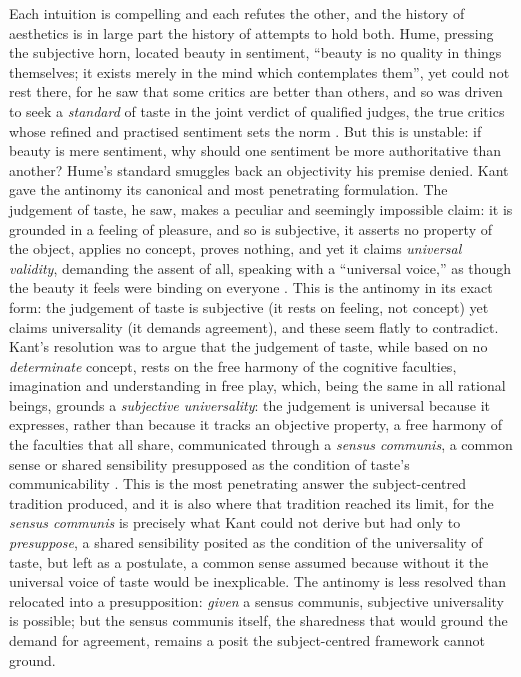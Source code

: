 Each intuition is compelling and each refutes the other, and the history of aesthetics is in large part the history of attempts to hold both. Hume, pressing the subjective horn, located beauty in sentiment, ``beauty is no quality in things themselves; it exists merely in the mind which contemplates them'', yet could not rest there, for he saw that some critics are better than others, and so was driven to seek a \emph{standard} of taste in the joint verdict of qualified judges, the true critics whose refined and practised sentiment sets the norm \parencite{hume1985}. But this is unstable: if beauty is mere sentiment, why should one sentiment be more authoritative than another? Hume's standard smuggles back an objectivity his premise denied. Kant gave the antinomy its canonical and most penetrating formulation. The judgement of taste, he saw, makes a peculiar and seemingly impossible claim: it is grounded in a feeling of pleasure, and so is subjective, it asserts no property of the object, applies no concept, proves nothing, and yet it claims \emph{universal validity}, demanding the assent of all, speaking with a ``universal voice,'' as though the beauty it feels were binding on everyone \parencite{kant1987}. This is the antinomy in its exact form: the judgement of taste is subjective (it rests on feeling, not concept) yet claims universality (it demands agreement), and these seem flatly to contradict. Kant's resolution was to argue that the judgement of taste, while based on no \emph{determinate} concept, rests on the free harmony of the cognitive faculties, imagination and understanding in free play, which, being the same in all rational beings, grounds a \emph{subjective universality}: the judgement is universal because it expresses, rather than because it tracks an objective property, a free harmony of the faculties that all share, communicated through a \emph{sensus communis}, a common sense or shared sensibility presupposed as the condition of taste's communicability \parencite{kant1987}. This is the most penetrating answer the subject-centred tradition produced, and it is also where that tradition reached its limit, for the \emph{sensus communis} is precisely what Kant could not derive but had only to \emph{presuppose}, a shared sensibility posited as the condition of the universality of taste, but left as a postulate, a common sense assumed because without it the universal voice of taste would be inexplicable. The antinomy is less resolved than relocated into a presupposition: \emph{given} a sensus communis, subjective universality is possible; but the sensus communis itself, the sharedness that would ground the demand for agreement, remains a posit the subject-centred framework cannot ground.

